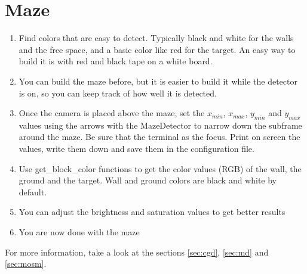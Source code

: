 \section{Maze}
\label{sec:howto:maze}

    \begin{enumerate}
        \item Find colors that are easy to detect. Typically black and 
            white for the walls and the free space, and a basic color 
            like red for the target. An easy way to build it is with red 
            and black tape on a white board.
        \item You can build the maze before, but it is easier to build 
            it while the detector is on, so you can keep track of how 
            well it is detected.
        \item Once the camera is placed above the maze, set the 
            $x_{min}$, $x_{max}$, $y_{min}$ and $y_{max}$
            values using the arrows with the 
            MazeDetector to narrow down the subframe around the maze. 
            Be sure that the terminal as the focus. Print on screen the 
            values, write them down and save them in the configuration file.
        \item Use get\_block\_color functions to get the color values 
            (RGB) of the wall, the ground and the target. Wall and ground 
            colors are black and white by default.
        \item You can adjust the brightness and saturation values to get 
            better results
        \item You are now done with the maze
    \end{enumerate}

For more information, take a look at the sections \ref{sec:cgd},  
\ref{sec:md} and \ref{sec:mosm}.
